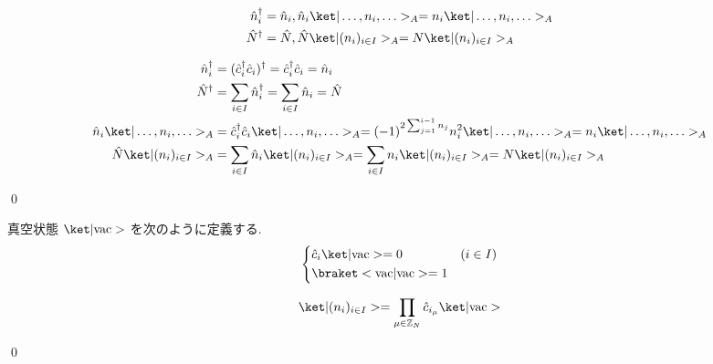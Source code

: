 \documentclass[uplatex,dvipdfmx,a4paper,11pt]{jlreq}
\makeatletter
\newcommand{\ZZ}{\mathbb{Z}}
\numberwithin{equation}{section}
\theoremstyle{definition}
\renewenvironment{proof}[1][\proofname]{\par
  \normalfont
  \topsep6\p@\@plus6\p@ \trivlist
  \item[\hskip\labelsep{\bfseries #1}\@addpunct{\bfseries}]\ignorespaces\quad\par
}{
  \qed\endtrivlist\@endpefalse
}
\renewcommand\proofname{証明}
\makeatother
\begin{document}
\begin{proposition}[Q21-54(i)(ii)(iii)(iv)]
  \begin{align}
    \hat{n}_i^\dagger & = \hat{n}_i, \hat{n}_i\ket|\ldots,n_i,\ldots>_A = n_i\ket|\ldots,n_i,\ldots>_A \\
    \hat{N}^\dagger   & = \hat{N}, \hat{N}\ket|(n_i)_{i\in I}>_A = N\ket|(n_i)_{i\in I}>_A
  \end{align}
\end{proposition}
\begin{proof}
  \begin{align}
    \hat{n}_i^\dagger                  & = (\hat{c}_i^\dagger\hat{c}_i)^\dagger = \hat{c}_i^\dagger\hat{c}_i = \hat{n}_i                                                                  \\
    \hat{N}^\dagger                    & = \sum_{i\in I}\hat{n}_i^\dagger = \sum_{i\in I}\hat{n}_i = \hat{N}                                                                              \\
    \hat{n}_i\ket|\ldots,n_i,\ldots>_A & = \hat{c}_i^\dagger\hat{c}_i\ket|\ldots,n_i,\ldots>_A = (-1)^{2\sum_{j=1}^{i-1}n_j}n_i^2\ket|\ldots,n_i,\ldots>_A = n_i\ket|\ldots,n_i,\ldots>_A \\
    \hat{N}\ket|(n_i)_{i\in I}>_A      & = \sum_{i\in I}\hat{n}_i\ket|(n_i)_{i\in I}>_A = \sum_{i\in I}n_i\ket|(n_i)_{i\in I}>_A = N\ket|(n_i)_{i\in I}>_A
  \end{align}
\end{proof}

\begin{definition}
  真空状態 $\ket|\mathrm{vac}>$ を次のように定義する.
  \begin{align}
    \begin{dcases}
      \hat{c}_i\ket|\mathrm{vac}> = 0 & (i\in I) \\
      \braket<\mathrm{vac}|\mathrm{vac}> = 1
    \end{dcases}
  \end{align}
\end{definition}
\begin{proposition}[Q21-55]
  \begin{align}
    \ket|(n_i)_{i\in I}> = \prod_{\mu\in\ZZ_N}\hat{c}_{i_\mu}\ket|\mathrm{vac}>
  \end{align}
\end{proposition}
\begin{proof}

\end{proof}
\end{document}
